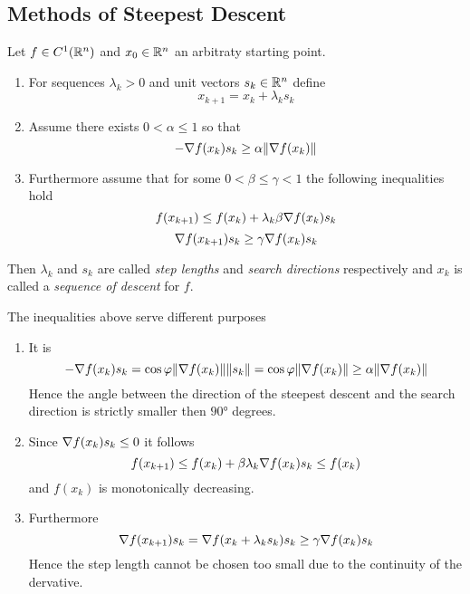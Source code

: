 \subsection{Methods of Steepest Descent}
\bigskip


\begin{definition}
    Let \( f \in C^1(\mathbb{R}^n) \) and \( x_0 \in \mathbb{R}^n \) an arbitraty starting point.
    \begin{enumerate}
        \item For sequences \( \lambda_k > 0 \) and unit vectors \( s_k \in \mathbb{R}^n \) define
              \[
                  x_{k + 1} = x_k + \lambda_k s_k
              \]
        \item Assume there exists \( 0 < \alpha \le 1 \) so that
              \[
                  - \nabla f(x_k) s_k \ge \alpha \|\nabla f(x_k)\|
              \]
        \item Furthermore assume that for some \( 0 < \beta \le \gamma < 1 \) the following inequalities hold
              \[
                  f(x_{k + 1}) \le f(x_k) + \lambda_k \beta \nabla f(x_k) s_k
              \]
              \[
                  \nabla f(x_{k + 1}) s_k \ge \gamma \nabla f(x_k) s_k
              \]
    \end{enumerate}
    Then \( \lambda_k \) and  \( s_k \) are called \emph{step lengths} and \emph{search directions} respectively
    and \( x_k \) is called a \emph{sequence of descent} for \( f \).
\end{definition}
\bigskip


\begin{remarks}
    The inequalities above serve different purposes
    \begin{enumerate}
        \item  It is
              \[
                  - \nabla f(x_k) s_k = \cos\varphi \|\nabla f(x_k)\| \|s_k\| =
                  \cos\varphi \|\nabla f(x_k)\| \ge \alpha \|\nabla f(x_k)\|
              \]
              Hence the angle between the direction of the steepest descent and the search direction is
              strictly smaller then \( \ang{90} \) degrees.
        \item  Since \( \nabla f(x_k) s_k \le 0 \) it follows
              \[
                  f(x_{k + 1}) \le f(x_k) + \beta \lambda_k \nabla f(x_k) s_k \le f(x_k)
              \]
              and \( f(x_k) \) is monotonically decreasing.
        \item Furthermore
              \[
                  \nabla f(x_{k + 1}) s_k = \nabla f(x_k + \lambda_k s_k) s_k
                  \ge \gamma \nabla f(x_k) s_k
              \]
              Hence the step length cannot be chosen too small due to the continuity of the dervative.
    \end{enumerate}
\end{remarks}
\bigskip



